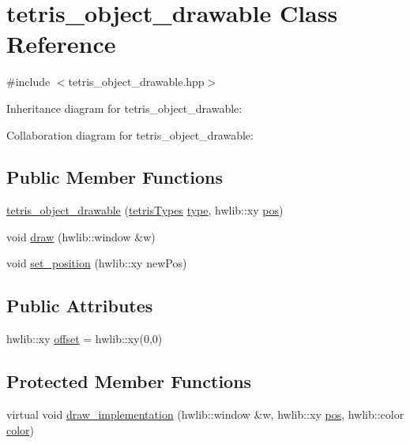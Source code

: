 \hypertarget{classtetris__object__drawable}{}\section{tetris\+\_\+object\+\_\+drawable Class Reference}
\label{classtetris__object__drawable}


{\ttfamily \#include $<$tetris\+\_\+object\+\_\+drawable.\+hpp$>$}



Inheritance diagram for tetris\+\_\+object\+\_\+drawable\+:


Collaboration diagram for tetris\+\_\+object\+\_\+drawable\+:
\subsection*{Public Member Functions}
\begin{DoxyCompactItemize}
\item 
\hyperlink{classtetris__object__drawable_a4a9edbb5b747f9b7b3732547b66a89d7}{tetris\+\_\+object\+\_\+drawable} (\hyperlink{enums_8hpp_aa2b983d3f5fee7f17796e5ef5040d787}{tetris\+Types} \hyperlink{classtetris__object__drawable_a340ea25384078c922b226a9edd5a7eba}{type}, hwlib\+::xy \hyperlink{classtetris__object__drawable_ae4cdab0c98e79aff3d200b9bca0cee2a}{pos})
\item 
void \hyperlink{classtetris__object__drawable_a41be74f61608223f562f7082825919a0}{draw} (hwlib\+::window \&w)
\item 
void \hyperlink{classtetris__object__drawable_a6442249846e75243311d84cd58e0514e}{set\+\_\+position} (hwlib\+::xy new\+Pos)
\end{DoxyCompactItemize}
\subsection*{Public Attributes}
\begin{DoxyCompactItemize}
\item 
hwlib\+::xy \hyperlink{classtetris__object__drawable_adfd6e3cfe2b6f26b0c9af17c6ea8c307}{offset} = hwlib\+::xy(0,0)
\end{DoxyCompactItemize}
\subsection*{Protected Member Functions}
\begin{DoxyCompactItemize}
\item 
virtual void \hyperlink{classtetris__object__drawable_a769565a2a650fa1a8b1c11825a6ddafa}{draw\+\_\+implementation} (hwlib\+::window \&w, hwlib\+::xy \hyperlink{classtetris__object__drawable_ae4cdab0c98e79aff3d200b9bca0cee2a}{pos}, hwlib\+::color \hyperlink{classtetris__object__drawable_acadb3c4b01c21a02c89125fc8931aa27}{color})
\end{DoxyCompactItemize}
